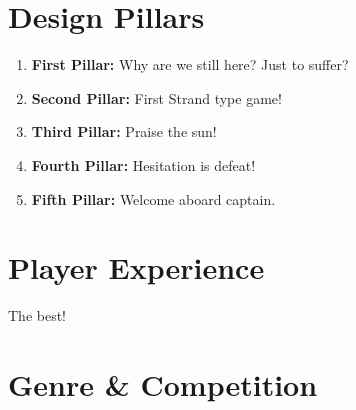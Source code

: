\section{Design Pillars}

\begin{enumerate}
	\item \textbf{First Pillar:} Why are we still here? Just to suffer?
	\item \textbf{Second Pillar:} First Strand type game!
	\item \textbf{Third Pillar:} Praise the sun!
	\item \textbf{Fourth Pillar:} Hesitation is defeat!
	\item \textbf{Fifth Pillar:} Welcome aboard captain.
\end{enumerate}

\lipsum[4]

\section{Player Experience}

The best!

\lipsum[5]

\section{Genre \& Competition}

\lipsum[6]
